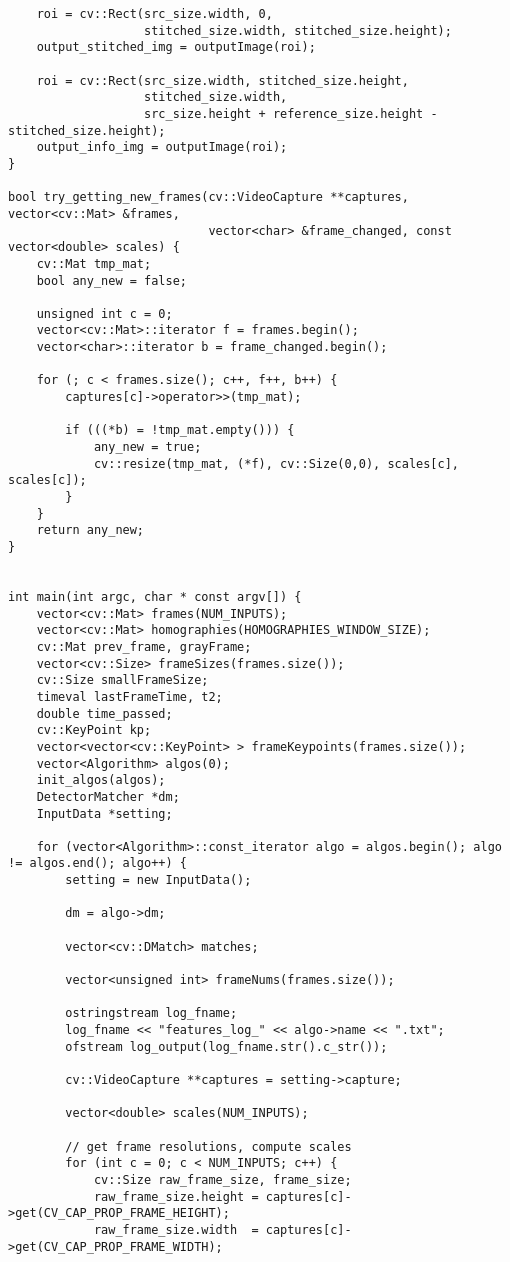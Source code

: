 \begin{lstlisting}
    roi = cv::Rect(src_size.width, 0, 
                   stitched_size.width, stitched_size.height);
    output_stitched_img = outputImage(roi);
    
	roi = cv::Rect(src_size.width, stitched_size.height,
                   stitched_size.width,
                   src_size.height + reference_size.height - stitched_size.height);
	output_info_img = outputImage(roi);    
}

bool try_getting_new_frames(cv::VideoCapture **captures, vector<cv::Mat> &frames,
                            vector<char> &frame_changed, const vector<double> scales) {
    cv::Mat tmp_mat;
    bool any_new = false;
    
    unsigned int c = 0;
    vector<cv::Mat>::iterator f = frames.begin(); 
    vector<char>::iterator b = frame_changed.begin();
    
    for (; c < frames.size(); c++, f++, b++) {
        captures[c]->operator>>(tmp_mat);
        
        if (((*b) = !tmp_mat.empty())) {
            any_new = true;
            cv::resize(tmp_mat, (*f), cv::Size(0,0), scales[c], scales[c]);
        }
    }
    return any_new;
}


int main(int argc, char * const argv[]) {
    vector<cv::Mat> frames(NUM_INPUTS);
    vector<cv::Mat> homographies(HOMOGRAPHIES_WINDOW_SIZE);
    cv::Mat prev_frame, grayFrame;
    vector<cv::Size> frameSizes(frames.size());
    cv::Size smallFrameSize;
	timeval lastFrameTime, t2;
	double time_passed;
    cv::KeyPoint kp;
	vector<vector<cv::KeyPoint> > frameKeypoints(frames.size());
	vector<Algorithm> algos(0);
	init_algos(algos);
	DetectorMatcher *dm;
	InputData *setting;
    
	for (vector<Algorithm>::const_iterator algo = algos.begin(); algo != algos.end(); algo++) {
		setting = new InputData();
		
		dm = algo->dm;		
        
		vector<cv::DMatch> matches;
		
		vector<unsigned int> frameNums(frames.size());
        
		ostringstream log_fname;
		log_fname << "features_log_" << algo->name << ".txt";
		ofstream log_output(log_fname.str().c_str());		
        
        cv::VideoCapture **captures = setting->capture;
        
        vector<double> scales(NUM_INPUTS);
        
        // get frame resolutions, compute scales
        for (int c = 0; c < NUM_INPUTS; c++) {
            cv::Size raw_frame_size, frame_size;
            raw_frame_size.height = captures[c]->get(CV_CAP_PROP_FRAME_HEIGHT);
            raw_frame_size.width  = captures[c]->get(CV_CAP_PROP_FRAME_WIDTH);
            

\end{lstlisting}
